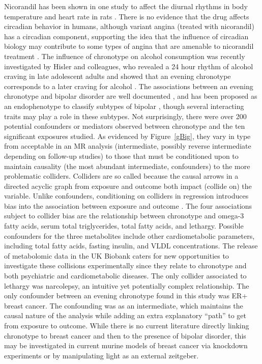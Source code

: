 \documentclass[genes,article,accept,moreauthors,pdftex]{Definitions/mdpi}
\begin{document}
\begin{paracol}{2}
Nicorandil has been shown in one study to affect the diurnal rhythms in body temperature and heart rate in rats \cite{gantenbein_nicorandil_1998}. There is no evidence that the drug affects circadian behavior in humans, although variant angina (treated with nicorandil) has a circadian component, supporting the idea that the influence of circadian biology may contribute to some types of angina that are amenable to nicorandil treatment \cite{kusama_variant_2011}. The influence of chronotype on alcohol consumption was recently investigated by Hisler and colleagues, who revealed a 24 hour rhythm of alcohol craving in late adolescent adults and showed that an evening chronotype corresponds to a later craving for alcohol \cite{hisler_is_2021}. The associations between an evening chronotype and bipolar disorder are well documented \cite{ferrer_clock_2020}, and has been proposed as an endophenotype to classify subtypes of bipolar \cite{romo-nava_evening_2020}, though several interacting traits may play a role in these subtypes.
Not surprisingly, there were over 200 potential confounders or mediators observed between chronotype and the ten significant exposures studied. As evidenced by Figure~\ref{gBig}, they vary in type from acceptable in an MR analysis (intermediate, possibly reverse intermediate depending on follow-up studies) to those that must be conditioned upon to maintain causality (the most abundant intermediate, confounders) to the more problematic colliders. Colliders are so called because the causal arrows in a directed acyclic graph from exposure and outcome both impact (collide on) the variable. Unlike confounders, conditioning on colliders in regression introduces bias into the association between exposure and outcome \cite{rohrer_thinking_2018}. The four associations subject to collider bias are the relationship between chronotype and omega-3 fatty acids, serum total triglycerides, total fatty acids, and lethargy. Possible confounders for the three metabolites include other cardiometabolic parameters, including total fatty acids, fasting insulin, and VLDL concentrations. The release of metabolomic data in the UK Biobank \cite{allen_uk_2014} caters for new opportunities to investigate these collisions experimentally since they relate to chronotype and both psychiatric and cardiometabolic diseases. The only collider associated to lethargy was narcolepsy, an intuitive yet potentially complex relationship. The only confounder between an evening chronotype found in this study was ER+ breast cancer. The confounding was as an intermediate, which maintains the causal nature of the analysis while adding an extra explanatory ``path'' to get from exposure to outcome. While there is no current literature directly linking chronotype to breast cancer and then to the presence of bipolar disorder, this may be investigated in current murine models of breast cancer via knockdown experiments or by manipulating light as an external zeitgeber.


\end{paracol}
\end{document}
